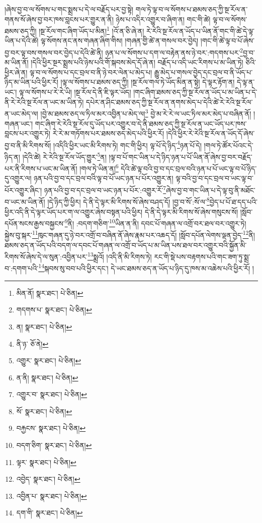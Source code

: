 །ཞེས་བྱ་བ་ལ་སོགས་པ་གང་སྨྲས་པ་དེ་ལ་བརྗོད་པར་བྱ་སྟེ། གལ་ཏེ་ལྟ་བ་ལ་སོགས་པ་ཐམས་ཅད་ཀྱི་སྔ་རོལ་ན་གནས་སོ་ཞེས་བྱ་བར་ཁས་བླངས་པར་གྱུར་ན་ནི། ཉེས་པ་འདིར་འགྱུར་བ་ཞིག་ན། གང་གི་ཚེ། ལྟ་བ་ལ་སོགས་ཐམས་ཅད་ཀྱི། །སྔ་རོལ་གང་ཞིག་ཡོད་པ་མིན།\footnote{མིན་ནོ།  སྣར་ཐང་།  པེ་ཅིན། } །འོ་ན་ཅི་ཞེ་ན། རེ་རེའི་སྔ་རོལ་ན་ཡོད་པ་ཡིན་ནོ་གང་གི་ཚེ་དེ་ལྟ་ཡིན་པ་དེའི་ཚེ། ལྟ་སོགས་ནང་ནས་གཞན་ཞིག་གིས། །གཞན་གྱི་ཚེ་ན་གསལ་བར་བྱེད། །གང་གི་ཚེ་ལྟ་བ་པོ་ཞེས་བྱ་བར་ལྟ་བས་གསལ་བར་བྱེད་པ་དེའི་ཚེ་ནི། ཉན་པ་ལ་སོགས་པ་དག་ལ་བརྟེན་ནས་ཉེ་བར་:གདགས་པར་\footnote{གདགས་པ་  སྣར་ཐང་།  པེ་ཅིན། }བྱ་བ་མ་ཡིན་ནོ། །དེའི་ཕྱིར་སྔར་སྨྲས་པའི་ཉེས་པའི་གོ་སྐབས་མེད་དོ་ཞེ་ན། བརྗོད་པ་འདི་ཡང་རིགས་པ་མ་ཡིན་ཏེ། ཅིའི་ཕྱིར་ཞེ་ན། ལྟ་བ་ལ་སོགས་པ་དང་བྲལ་བ་ནི་ཉེ་བར་ལེན་པ་མེད་པ། རྒྱུ་མེད་པ་གསལ་བྱེད་དང་བྲལ་བ་ནི་ཡོད་པ་ཉིད་མ་ཡིན་པའི་ཕྱིར་རོ། །ལྟ་ལ་སོགས་པ་ཐམས་ཅད་ཀྱི། །སྔ་རོལ་གལ་ཏེ་ཡོད་མིན་ན་སྟེ། དེ་ལྟར་རྟོག་ན། དེ་ལྟ་ན་ཡང་། ལྟ་ལ་སོགས་པ་རེ་རེ་ཡི། །སྔ་རོལ་དེ་ནི་ཇི་ལྟར་ཡོད། །གང་ཞིག་ཐམས་ཅད་ཀྱི་སྔ་རོལ་ན་ཡོད་པ་མ་ཡིན་པ་དེ་ནི་རེ་རེའི་སྔ་རོལ་ན་ཡང་མ་ཡིན་ཏེ། དཔེར་ན་ཤིང་ཐམས་ཅད་ཀྱི་སྔ་རོལ་ན་ནགས་མེད་པ་དེའི་ཚེ་རེ་རེའི་སྔ་རོལ་ན་ཡང་མེད་ལ། །བྱེ་མ་ཐམས་ཅད་ལ་ཏིལ་མར་འབྱིན་པ་མེད་ལ།\footnote{ན།  སྣར་ཐང་།  པེ་ཅིན། } བྱེ་མ་རེ་རེ་ལ་ཡང་ཏིལ་མར་མེད་པ་བཞིན་ནོ། །གཞན་ཡང་། གང་ཞིག་རེ་རེའི་སྔ་རོལ་དུ་ཡོད་པར་འགྱུར་བ་དེ་ནི་ཐམས་ཅད་ཀྱི་སྔ་རོལ་ན་ཡང་ཡོད་པར་ཁས་བླངས་པར་འགྱུར་ཏེ། རེ་རེ་མ་གཏོགས་པར་ཐམས་ཅད་མེད་པའི་ཕྱིར་རོ། །དེའི་ཕྱིར་རེ་རེའི་སྔ་རོལ་ན་ཡོད་དོ་ཞེས་བྱ་བ་ནི་མི་རིགས་སོ། །འདིའི་ཕྱིར་ཡང་མི་རིགས་ཏེ། གང་གི་ཕྱིར། ལྟ་པོ་དེ་ཉིད་\footnote{ནི་ཉ་  ཅོ་ནེ། }ཉན་པོ་དེ། །གལ་ཏེ་ཚོར་པོའང་དེ་ཉིད་ན། །དེའི་ཚེ། རེ་རེའི་སྔ་རོལ་ཡོད་གྱུར་\footnote{འགྱུར་  སྣར་ཐང་།  པེ་ཅིན། }ན། །ལྟ་བ་པོ་གང་ཡིན་པ་དེ་ཉིད་ཉན་པ་པོ་ཡིན་ནོ་ཞེས་བྱ་བར་བརྗོད་པར་ནི་རིགས་པ་ཡང་མ་ཡིན་ནོ། །གལ་ཏེ་ཡིན་ན།\footnote{ན་ནི།  སྣར་ཐང་།  པེ་ཅིན། } དེའི་ཚེ་ལྟ་བའི་བྱ་བ་དང་བྲལ་བའི་ཉན་པ་པོ་ཡང་ལྟ་བ་པོ་ཉིད་དུ་འགྱུར་ལ། ཉན་པའི་བྱ་བ་དང་བྲལ་བའི་ལྟ་བ་པོ་ཡང་ཉན་པ་པོར་འགྱུར་ན། ལྟ་བའི་བྱ་བ་དང་བྲལ་བ་ཡང་ལྟ་བ་པོར་འགྱུར་ཞིང་། ཉན་པའི་བྱ་བ་དང་བྲལ་བ་ཡང་ཉན་པ་པོར་:འགྱུར་རོ་\footnote{འགྱུར་བ་  སྣར་ཐང་།  པེ་ཅིན། }ཞེས་བྱ་བ་གང་ཡིན་པ་དེ་ལྟ་བུ་ནི་མཐོང་བ་ཡང་མ་ཡིན་ནོ། །དེ་ཉིད་ཀྱི་ཕྱིར། དེ་ནི་དེ་ལྟར་མི་རིགས་སོ་ཞེས་བཤད་དོ། །བྱ་བ་སོ་:སོ་ལ་\footnote{སོ་  སྣར་ཐང་།  པེ་ཅིན། }བྱེད་པ་པོ་ཐ་དད་པའི་ཕྱིར་འདི་ནི་དེ་ལྟར་ཡོད་པར་ག་ལ་འགྱུར་ཞེས་བསྟན་པའི་ཕྱིར། དེ་ནི་དེ་ལྟར་མི་རིགས་སོ་ཞེས་གསུངས་སོ། །སློབ་དཔོན་སངས་རྒྱས་བསྐྱངས་\footnote{བརྐྱངས་  སྣར་ཐང་།  པེ་ཅིན། }ནི། :བདག་གཅིག་\footnote{བདག་ཅིག་  སྣར་ཐང་།  པེ་ཅིན། }ཡིན་ན་ནི། དབང་པོ་གཞན་ལ་འགྲོ་བར་ཐལ་བར་འགྱུར་ཏེ། སྐྱེས་བུ་སྐར་\footnote{ལྟར་  སྣར་ཐང་།  པེ་ཅིན། }ཁུང་གཞན་དུ་ཉེ་བར་འགྲོ་བ་བཞིན་ནོ་ཞེས་རྣམ་པར་འཆད་དོ། །སློབ་དཔོན་ལེགས་ལྡན་བྱེད་\footnote{འབྱེད་  སྣར་ཐང་།  པེ་ཅིན། }ནི། ཐམས་ཅད་ན་ཡོད་པའི་བདག་ལ་དབང་པོ་གཞན་ལ་འགྲོ་བ་ཡོད་པ་མ་ཡིན་པས་ཐལ་བར་འགྱུར་བའི་སྐྱོན་མི་རིགས་སོ་ཞེས་དེ་ལ་སུན་:འབྱིན་པར་\footnote{འབྱིན་པ་  སྣར་ཐང་།  པེ་ཅིན། }སྨྲའོ། །འདི་ནི་མི་རིགས་ཏེ། རང་གི་སྡེ་པས་བརྟགས་པའི་གང་ཟག་ཏུ་སྨྲ་བ་:དགག་པའི་\footnote{དག་གི་  སྣར་ཐང་།  པེ་ཅིན། }སྐབས་སུ་བབ་པའི་ཕྱིར་དང་། དེ་ཡང་ཐམས་ཅད་ན་ཡོད་པ་ཉིད་དུ་ཁས་མ་འཆེས་པའི་ཕྱིར་རོ། །
